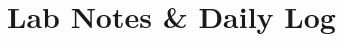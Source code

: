\documentclass[twoside]{article}
\begin{document}
	\clearpage
	\pagestyle{style2}
	\part{Lab Notes \& Daily Log}
	

	
	
	
	
	
	
	
	
	
	
	
\end{document}
